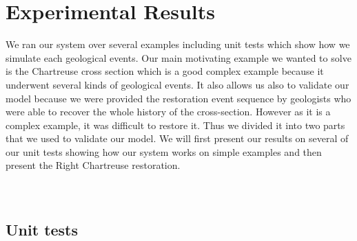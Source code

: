 \documentclass[12pt, a4paper]{report} %
\begin{document}
\chapter{Experimental Results}
We ran our system over several examples including unit tests which show how we simulate each geological events.
Our main motivating example we wanted to solve is the Chartreuse cross section which is a good complex example because it underwent several kinds of geological events. It also allows us also to validate our model because we were provided the restoration event sequence by geologists who were able to recover the whole history of the cross-section. However as it is a complex example, it was difficult to restore it. Thus we divided it into two parts that we used to validate our model.
We will first present our results on several of our unit tests showing how our system works on simple examples and then present the Right Chartreuse restoration.\\\\\
\section{Unit tests}
\end{document}
